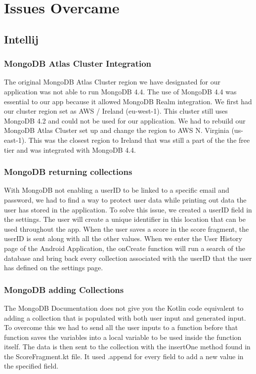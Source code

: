 \section {Issues Overcame}
\subsection{Intellij}
\subsubsection{MongoDB Atlas Cluster Integration}
The original MongoDB Atlas Cluster region we have designated for our application was not able to run MongoDB 4.4. The use of MongoDB 4.4 was essential to our app because it allowed MongoDB Realm integration. We first had our cluster region set as AWS / Ireland (eu-west-1). This cluster still uses MongoDB 4.2 and could not be used for our application. We had to rebuild our MongoDB Atlas Cluster set up and change the region to AWS N. Virginia (us-east-1). This was the closest region to Ireland that was still a part of the the free tier and was integrated with MongoDB 4.4.

\subsubsection{MongoDB returning collections}
With MongoDB not enabling a userID to be linked to a specific email and password, we had to find a way to protect user data while printing out data the user has stored in the application. To solve this issue, we created a userID field in the settings. The user will create a unique identifier in this location that can be used throughout the app. When the user saves a score in the score fragment, the userID is sent along with all the other values. When we enter the User History page of the Android Application, the onCreate function will run a search of the database and bring back every collection associated with the userID that the user has defined on the settings page.

\subsubsection{MongoDB adding Collections}
The MongoDB Documentation does not give you the Kotlin code equivalent to adding a collection that is populated with both user input and generated input. To overcome this we had to send all the user inputs to a function before that function saves the variables into a local variable to be used inside the function itself. The data is then sent to the collection with the insertOne method found in the ScoreFragment.kt file. It used .append for every field to add a new value in the specified field.
